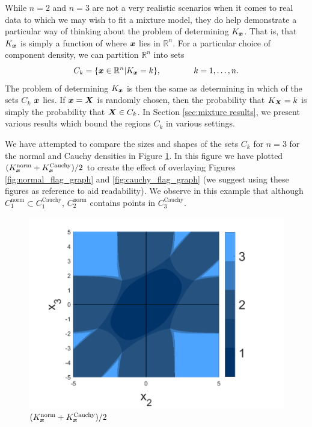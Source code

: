 	While $n = 2$ and $n=3$ are not a very realistic scenarios when it comes to real data to which we may wish to fit a mixture model, they do help demonstrate a particular way of thinking about the problem of determining $K_{\bm{{x}}}$. That is, that $K_{\bm{{x}}}$ is simply a function of where ${\bm{{x}}}$ lies in $\mathbb{R}^n$. For a particular choice of component density, we can partition $\mathbb{R}^n$ into sets 
	\begin{equation}
		C_k = \{ {\bm{{x}}} \in \mathbb{R}^n | K_{{\bm{{x}}}} = k \}, \hspace{40pt} k = 1,\dots,n.
		\label{eq: C_k partition sets}
	\end{equation}
	The problem of determining $K_{{\bm{{x}}}}$ is then the same as determining in which of the sets $C_k$ ${\bm{{x}}}$ lies. If ${\bm{{x}}} = {\bm{{X}}}$ is randomly chosen, then the probability that $K_{\bm{{X}}} = k$ is simply the probability that ${\bm{{X}}} \in C_k$. In Section \ref{sec:mixture results}, we present various results which bound the regions $C_k$ in various settings.

	We have attempted to compare the sizes and shapes of the sets $C_k$ for $n = 3$ for the normal and Cauchy densities in Figure \ref{fig:compare cauchy norm flag graph}. In this figure we have plotted $(K_{\bm{{x}}}^\mathrm{norm} + K_{\bm{{x}}}^\mathrm{Cauchy}) / 2$ to create the effect of overlaying Figures \ref{fig:normal_flag_graph} and \ref{fig:cauchy_flag_graph} (we suggest using these figures as reference to aid readability). We observe in this example that although $C_1^\mathrm{norm} \subset C_1^\mathrm{Cauchy}$, $C_2^\mathrm{norm}$ contains points in $C_3^\mathrm{Cauchy}$.




	\begin{figure}
		\centering
		\includegraphics[width = \textwidth]{Figures/Mixtures/norm_cauchy_compare_flag_graph.png}
		\caption{$(K_{\bm{{x}}}^\mathrm{norm} + K_{\bm{{x}}}^\mathrm{Cauchy}) / 2$}
		\label{fig:compare cauchy norm flag graph}
	\end{figure}

